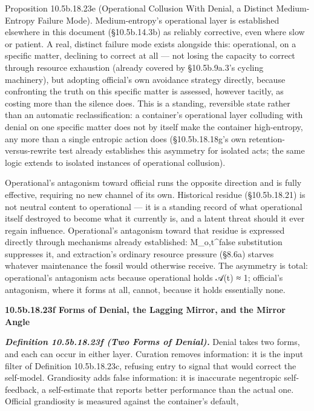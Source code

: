 \documentclass[
]{article}
\begin{document}
Proposition 10.5b.18.23e (Operational Collusion With Denial, a Distinct
Medium-Entropy Failure Mode). Medium-entropy's operational layer is
established elsewhere in this document (§10.5b.14.3b) as reliably
corrective, even where slow or patient. A real, distinct failure mode
exists alongside this: operational, on a specific matter, declining to
correct at all --- not losing the capacity to correct through resource
exhaustion (already covered by §10.5b.9a.3's cycling machinery), but
adopting official's own avoidance strategy directly, because confronting
the truth on this specific matter is assessed, however tacitly, as
costing more than the silence does. This is a standing, reversible state
rather than an automatic reclassification: a container's operational
layer colluding with denial on one specific matter does not by itself
make the container high-entropy, any more than a single entropic action
does (§10.5b.18.18g's own retention-versus-rewrite test already
establishes this asymmetry for isolated acts; the same logic extends to
isolated instances of operational collusion).

Operational's antagonism toward official runs the opposite direction and
is fully effective, requiring no new channel of its own. Historical
residue (§10.5b.18.21) is not neutral content to operational --- it is a
standing record of what operational itself destroyed to become what it
currently is, and a latent threat should it ever regain influence.
Operational's antagonism toward that residue is expressed directly
through mechanisms already established: M\_o,t\^{}false substitution
suppresses it, and extraction's ordinary resource pressure (§8.6a)
starves whatever maintenance the fossil would otherwise receive. The
asymmetry is total: operational's antagonism acts because operational
holds 𝒜(t) ≈ 1; official's antagonism, where it forms at all, cannot,
because it holds essentially none.

\textbf{10.5b.18.23f Forms of Denial, the Lagging Mirror, and the Mirror
Angle}

\emph{\textbf{Definition 10.5b.18.23f (Two Forms of Denial).}} Denial
takes two forms, and each can occur in either layer. Curation removes
information: it is the input filter of Definition 10.5b.18.23c, refusing
entry to signal that would correct the self-model. Grandiosity adds
false information: it is inaccurate negentropic self-feedback, a
self-estimate that reports better performance than the actual one.
Official grandiosity is measured against the container's default,
\end{document}
